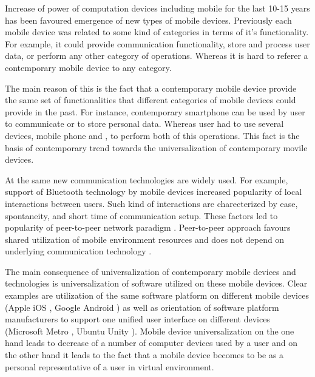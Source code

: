 %
Increase of power of computation devices including mobile for the last 10-15 years has been favoured \A emergence of new types of mobile devices. 
%
Previously each mobile device was related to some kind of categories in terms of it's functionality. 
%
For example, it could provide communication functionality, store and process user data, or perform any other category of operations. 
%
Whereas it is hard to referer a contemporary mobile device to any category. 

%
The main reason of this is the fact that a contemporary mobile device provide the same set of functionalities that different categories of mobile devices could provide in the past. 
%
For instance, contemporary smartphone can be used by user to communicate or to store personal data. 
%
Whereas \A user had to use several devices, mobile phone and , to perform both of this operations. 
%
This fact is the basis of contemporary trend towards the universalization of contemporary movile devices. 

%
At the same new communication technologies are widely used. 
%
For example, support of Bluetooth  technology by mobile devices increased popularity of local interactions between users. 
%
Such kind of interactions are charecterized by ease, spontaneity, and short time of communication setup. 
%
These factors led to popularity of peer-to-peer network paradigm . 
%
Peer-to-peer approach favours shared utilization of mobile environment resources and does not depend on underlying communication technology  . 

%
The main consequence of universalization of contemporary mobile devices and technologies is universalization of software utilized on these mobile devices. 
%
Clear examples are utilization of the same software platform on different mobile devices (Apple iOS , Google Android ) as well as orientation of software platform manufacturers to support one unified user interface on different devices (Microsoft Metro , Ubuntu Unity ). 
%
Mobile device universalization on the one hand leads to decrease of a number of computer devices used by a user and on the other hand it leads to the fact that a mobile device becomes to be as a personal representative of a user in virtual environment. 

